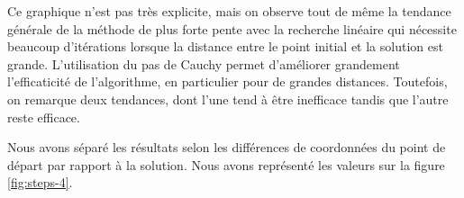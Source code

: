 \documentclass[11pt,a4paper,twoside,onecolumn,titlepage]{report}
\begin{document}
\begin{enumerate}[(a)]


Ce graphique n'est pas très explicite, mais on observe tout de même la tendance générale de la méthode de plus forte pente avec la recherche linéaire qui nécessite beaucoup d'itérations lorsque la distance entre le point initial et la solution est grande. L'utilisation du pas de Cauchy permet d'améliorer grandement l'efficaticité de l'algorithme, en particulier pour de grandes distances. Toutefois, on remarque deux tendances, dont l'une tend à être inefficace tandis que l'autre reste efficace.



Nous avons séparé les résultats selon les différences de coordonnées du point de départ par rapport à la solution. Nous avons représenté les valeurs sur la figure \ref{fig:steps-4}.


\end{enumerate}
\end{document}

